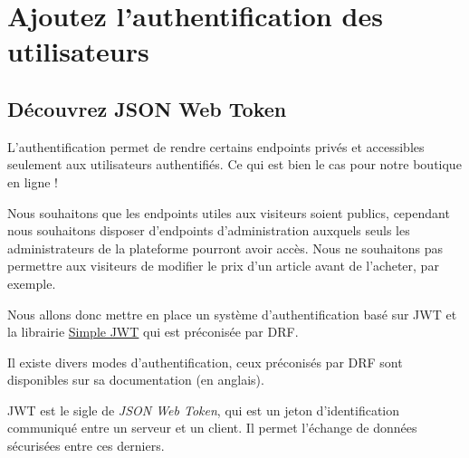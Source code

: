 %
%
%
%
%
%
% 
\section{Ajoutez l’authentification des utilisateurs}
\subsection{Découvrez JSON Web Token}
L’authentification permet de rendre certains endpoints {\color{monOrange}privés} et accessibles seulement aux utilisateurs authentifiés. Ce qui est bien le cas pour notre boutique en ligne !

Nous souhaitons que les endpoints utiles aux visiteurs soient publics, cependant nous souhaitons disposer d'{\color{monOrange}endpoints d’administration} auxquels seuls les administrateurs de la plateforme pourront avoir accès. Nous ne souhaitons pas permettre aux visiteurs de modifier le prix d’un article avant de l’acheter, par exemple.

Nous allons donc mettre en place un système d’authentification basé sur JWT et la librairie \href{https://www.django-rest-framework.org/api-guide/authentication/\#json-web-token-authentication}{Simple JWT} qui est préconisée par DRF.
\begin{theorem}
Il existe divers modes d'authentification, ceux préconisés par DRF sont disponibles sur sa {\color{monOrange}documentation} (en anglais).
\end{theorem}
JWT est le sigle de {\em JSON Web Token}, qui est un {\color{monOrange}jeton d’identification} communiqué entre un serveur et un client. Il permet l’échange de données sécurisées entre ces derniers.


